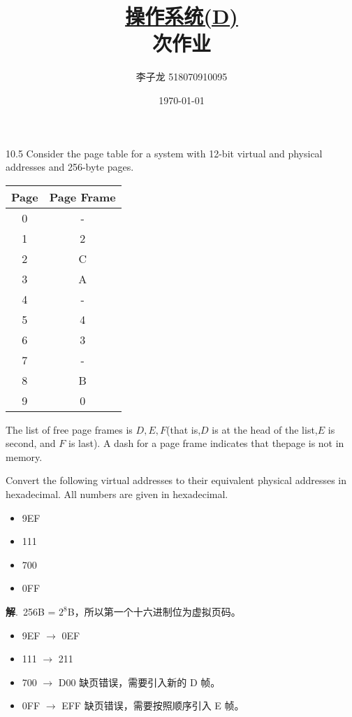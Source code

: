 \documentclass[12pt,a4paper]{article}
\newenvironment{problems}{\begin{list}{}{\renewcommand{\makelabel}[1]{\textbf{##1}\hfil}}}{\end{list}}
\providecommand{\sol}{\textbf{解}.~}
\begin{document}
\title{\normalsize \underline{操作系统(D)}\\ 次作业}
\author{李子龙 518070910095}
\date{\today}
\maketitle

\begin{problems}
    \item[10.5] Consider the page table for a system with 12-bit virtual and physical addresses and 256-byte pages.
    
    \begin{tabular}{cc}
        \hline
        Page & Page Frame \\
        \hline
        0 & - \\
        1 & 2 \\
        2 & C \\
        3 & A \\
        4 & - \\
        5 & 4 \\
        6 & 3 \\
        7 & - \\
        8 & B \\
        9 & 0 \\
        \hline
    \end{tabular}

    The list of free page frames is $D,E,F$(that is,$D$ is at the head of the list,$E$ is second, and $F$ is last). A dash for a page frame indicates that thepage is not in memory.
    
    Convert the following virtual addresses to their equivalent physical addresses in hexadecimal. All numbers are given in hexadecimal.

    \begin{itemize}
        \item 9EF
        \item 111
        \item 700
        \item 0FF
    \end{itemize}

    \sol 256B = $2^8$B，所以第一个十六进制位为虚拟页码。

    \begin{itemize}
        \item 9EF $\rightarrow$ 0EF
        \item 111 $\rightarrow$ 211
        \item 700 $\rightarrow$ D00 缺页错误，需要引入新的 D 帧。
        \item 0FF $\rightarrow$ EFF 缺页错误，需要按照顺序引入 E 帧。
    \end{itemize}


\end{problems}
\end{document}

